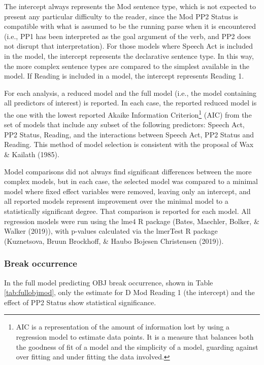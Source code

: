 \documentclass[12pt,oneside]{book}
\let\rmarkdownfootnote\footnote%
\def\footnote{\protect\rmarkdownfootnote}
\begin{document}
The intercept always represents the Mod sentence type, which is not expected to present any particular difficulty to the reader, since the Mod PP2 Status is compatible with what is assumed to be the running parse when it is encountered (i.e., PP1 has been interpreted as the goal argument of the verb, and PP2 does not disrupt that interpretation). For those models where Speech Act is included in the model, the intercept represents the declarative sentence type. In this way, the more complex sentence types are compared to the simplest available in the model. If Reading is included in a model, the intercept represents Reading 1.

For each analysis, a reduced model and the full model (i.e., the model containing all predictors of interest) is reported. In each case, the reported reduced model is the one with the lowest reported Akaike Information Criterion\footnote{AIC is a representation of the amount of information lost by using a regression model to estimate data points. It is a measure that balances both the goodness of fit of a model and the simplicity of a model, guarding against over fitting and under fitting the data involved.} (AIC) from the set of models that include any subset of the following predictors: Speech Act, PP2 Status, Reading, and the interactions between Speech Act, PP2 Status and Reading. This method of model selection is consistent with the proposal of Wax \& Kailath (1985).

Model comparisons did not always find significant differences between the more complex models, but in each case, the selected model was compared to a minimal model where  fixed effect variables were removed, leaving only an intercept, and all reported models represent improvement over the minimal model to a statistically significant degree. That comparison is reported for each model. All regression models were run using the lme4 R package (Bates, Maechler, Bolker, \& Walker (2019)), with p-values calculated via the lmerTest R package (Kuznetsova, Bruun Brockhoff, \& Haubo Bojesen Christensen (2019)).

\hypertarget{occReg}{%
\subsubsection{Break occurrence}\label{occReg}}

In the full model predicting OBJ break occurrence, shown in Table \ref{tab:fullobjmod}, only the estimate for D Mod Reading 1 (the intercept) and the effect of PP2 Status show statistical significance.
\end{document}
